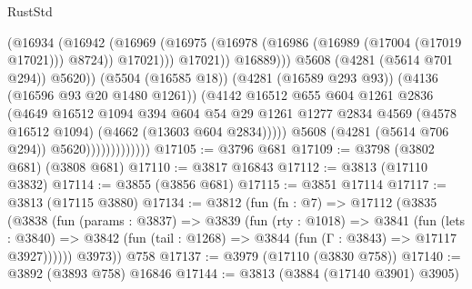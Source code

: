 \begin{lexlean}{RustStd}
\begin{coremodule}
{\begin{coremodule}
{{{{{{{{{{{{{{{{{{{{{{{{{{{{{{{{{{{                                            (@16934
                                              (@16942
                                                (@16969
                                                  (@16975
                                                    (@16978
                                                      (@16986
                                                        (@16989 (@17004 (@17019 @17021)))
                                                        @8724))
                                                    @17021)))
                                              @17021))
                                          @16889)))
                                    @5608
                                    (@4281 (@5614 @701 @294))
                                    @5620))
                                (@5504 (@16585 @18))
                                (@4281 (@16589 @293 @93))
                                (@4136 (@16596 @93 @20 @1480 @1261))
                                (@4142
                                  @16512
                                  @655
                                  @604
                                  @1261
                                  @2836
                                  (@4649
                                    @16512
                                    @1094
                                    @394
                                    @604
                                    @54
                                    @29
                                    @1261
                                    @1277
                                    @2834
                                    @4569
                                    (@4578 @16512 @1094)
                                    (@4662 (@13603 @604 @2834)))))
                              @5608
                              (@4281 (@5614 @706 @294))
                              @5620)))))))))))))
@17105 := @3796 @681
@17109 := @3798 (@3802 @681) (@3808 @681)
@17110 := @3817 @16843
@17112 := @3813 (@17110 @3832)
@17114 := @3855 (@3856 @681)
@17115 := @3851 @17114
@17117 := @3813 (@17115 @3880)
@17134 := @3812
    (fun (fn : @7) =>
    @17112
      (@3835
        (@3838
          (fun (params : @3837) =>
          @3839
            (fun (rty : @1018) =>
            @3841
              (fun (lets : @3840) =>
              @3842 (fun (tail : @1268) => @3844 (fun (Γ : @3843) => @17117 @3927))))))
        @3973))
    @758
@17137 := @3979 (@17110 (@3830 @758))
@17140 := @3892 (@3893 @758) @16846
@17144 := @3813 (@3884 (@17140 @3901) @3905)
}}}}}}}}}}}}}}}}}}}}}}}}}}}}}}}}}}}
\end{coremodule}}
\end{coremodule}
\end{lexlean}
